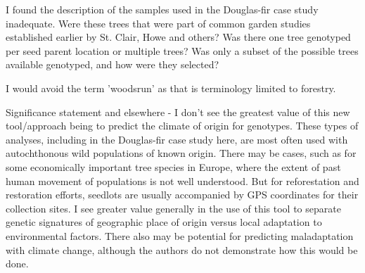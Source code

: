 \begin{point}{} %
I found the description of the samples used in the Douglas-fir case study inadequate. Were these trees that were part of common garden studies established earlier by St. Clair, Howe and others? Was there one tree genotyped per seed parent location or multiple trees? Was only a subset of the possible trees available genotyped, and how were they selected?
\end{point}


\begin{point}{} %
I would avoid the term 'woodsrun' as that is terminology limited to forestry.
\end{point}


\begin{point}{} %
Significance statement and elsewhere - I don't see the greatest value of this new tool/approach being to predict the climate of origin for genotypes. These types of analyses, including in the Douglas-fir case study here, are most often used with autochthonous wild populations of known origin. There may be cases, such as for some economically important tree species in Europe, where the extent of past human movement of populations is not well understood. But for reforestation and restoration efforts, seedlots are usually accompanied by GPS coordinates for their collection sites. I see greater value generally in the use of this tool to separate genetic signatures of geographic place of origin versus local adaptation to environmental factors. There also may be potential for predicting maladaptation with climate change, although the authors do not demonstrate how this would be done.
\end{point}


